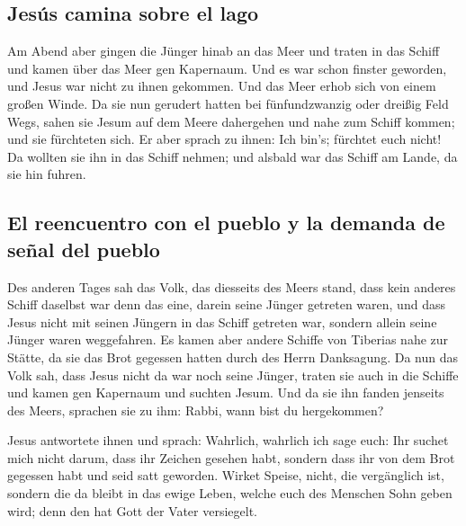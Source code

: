 \hypertarget{jesuxfas-camina-sobre-el-lago}{%
\subsection{Jesús camina sobre el
lago}\label{jesuxfas-camina-sobre-el-lago}}

 Am Abend aber gingen die Jünger hinab an das Meer
 und traten in das Schiff und kamen über das Meer gen
Kapernaum. Und es war schon finster geworden, und Jesus war nicht zu
ihnen gekommen.  Und das Meer erhob sich von einem großen
Winde.  Da sie nun gerudert hatten bei fünfundzwanzig
oder dreißig Feld Wegs, sahen sie Jesum auf dem Meere dahergehen und
nahe zum Schiff kommen; und sie fürchteten sich.  Er aber
sprach zu ihnen: Ich bin's; fürchtet euch nicht!  Da
wollten sie ihn in das Schiff nehmen; und alsbald war das Schiff am
Lande, da sie hin fuhren.

\hypertarget{el-reencuentro-con-el-pueblo-y-la-demanda-de-seuxf1al-del-pueblo}{%
\subsection{El reencuentro con el pueblo y la demanda de señal del
pueblo}\label{el-reencuentro-con-el-pueblo-y-la-demanda-de-seuxf1al-del-pueblo}}

 Des anderen Tages sah das Volk, das diesseits des Meers
stand, dass kein anderes Schiff daselbst war denn das eine, darein seine
Jünger getreten waren, und dass Jesus nicht mit seinen Jüngern in das
Schiff getreten war, sondern allein seine Jünger waren weggefahren.
 Es kamen aber andere Schiffe von Tiberias nahe zur
Stätte, da sie das Brot gegessen hatten durch des Herrn Danksagung.
 Da nun das Volk sah, dass Jesus nicht da war noch seine
Jünger, traten sie auch in die Schiffe und kamen gen Kapernaum und
suchten Jesum.  Und da sie ihn fanden jenseits des Meers,
sprachen sie zu ihm: Rabbi, wann bist du hergekommen?

 Jesus antwortete ihnen und sprach: Wahrlich, wahrlich
ich sage euch: Ihr suchet mich nicht darum, dass ihr Zeichen gesehen
habt, sondern dass ihr von dem Brot gegessen habt und seid satt
geworden.  Wirket Speise, nicht, die vergänglich ist,
sondern die da bleibt in das ewige Leben, welche euch des Menschen Sohn
geben wird; denn den hat Gott der Vater versiegelt.


